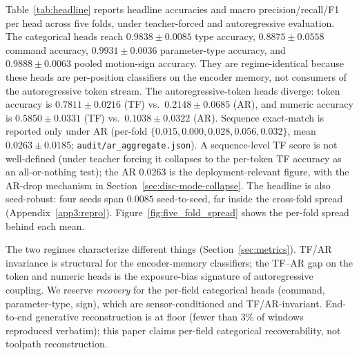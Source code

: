 \documentclass[sensors,article,submit,moreauthors,pdftex]{Definitions/mdpi}
\begin{document}
Table~\ref{tab:headline} reports headline accuracies and macro precision/recall/F1 per head across five folds, under teacher-forced and autoregressive evaluation. The categorical heads reach $0.9838 \pm 0.0085$ type accuracy, $0.8875 \pm 0.0558$ command accuracy, $0.9931 \pm 0.0036$ parameter-type accuracy, and $0.9888 \pm 0.0063$ pooled motion-sign accuracy. They are regime-identical because these heads are per-position classifiers on the encoder memory, not consumers of the autoregressive token stream. The autoregressive-token heads diverge: token accuracy is $0.7811 \pm 0.0216$ (TF) vs.\ $0.2148 \pm 0.0685$ (AR), and numeric accuracy is $0.5850 \pm 0.0331$ (TF) vs.\ $0.1038 \pm 0.0322$ (AR). Sequence exact-match is reported only under AR (per-fold $\{0.015, 0.000, 0.028, 0.056, 0.032\}$, mean $0.0263 \pm 0.0185$; \texttt{audit/ar\_aggregate.json}). A sequence-level TF score is not well-defined (under teacher forcing it collapses to the per-token TF accuracy as an all-or-nothing test); the AR $0.0263$ is the deployment-relevant figure, with the AR-drop mechanism in Section~\ref{sec:disc-mode-collapse}. The headline is also seed-robust: four seeds span $0.0085$ seed-to-seed, far inside the cross-fold spread (Appendix~\ref{app3:repro}). Figure~\ref{fig:five_fold_spread} shows the per-fold spread behind each mean.

The two regimes characterize different things (Section~\ref{sec:metrics}). TF/AR invariance is structural for the encoder-memory classifiers; the TF--AR gap on the token and numeric heads is the exposure-bias signature of autoregressive coupling. We reserve \emph{recovery} for the per-field categorical heads (command, parameter-type, sign), which are sensor-conditioned and TF/AR-invariant. End-to-end generative reconstruction is at floor (fewer than $3\%$ of windows reproduced verbatim); this paper claims per-field categorical recoverability, not toolpath reconstruction.
\end{document}
